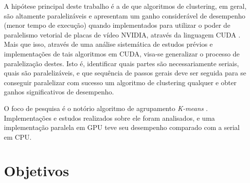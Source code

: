 \documentclass[12pt,
openright, 
oneside, %
a4paper,    %
brazil]{facom-ufu-abntex2}
\def\qntAlgrtm{dois}
\begin{document}
A hipótese principal deste trabalho é a de que algoritmos de clustering, em geral, são altamente paralelizáveis e apresentam um ganho considerável de desempenho (menor tempo de execução) quando implementados para utilizar o poder de paralelismo vetorial de placas de vídeo NVIDIA, através da linguagem CUDA \cite{CUDAZone}. Mais que isso, através de uma análise sistemática de estudos prévios e implementações de tais algoritmos em CUDA, visa-se generalizar o processo de paralelização destes. Isto é, identificar quais partes são necessariamente seriais, quais são paralelizáveis, e que sequência de passos gerais deve ser seguida para se conseguir paralelizar com sucesso um algoritmo de clustering qualquer e obter ganhos significativos de desempenho.



O foco de pesquisa é o notório algoritmo de agrupamento \textit{K-means} \cite{GPU-accelerated-K-Means}. Implementações e estudos realizados sobre ele foram analisados, e uma implementação paralela em GPU teve seu desempenho comparado com a serial em CPU.







\section{Objetivos}
\end{document}
